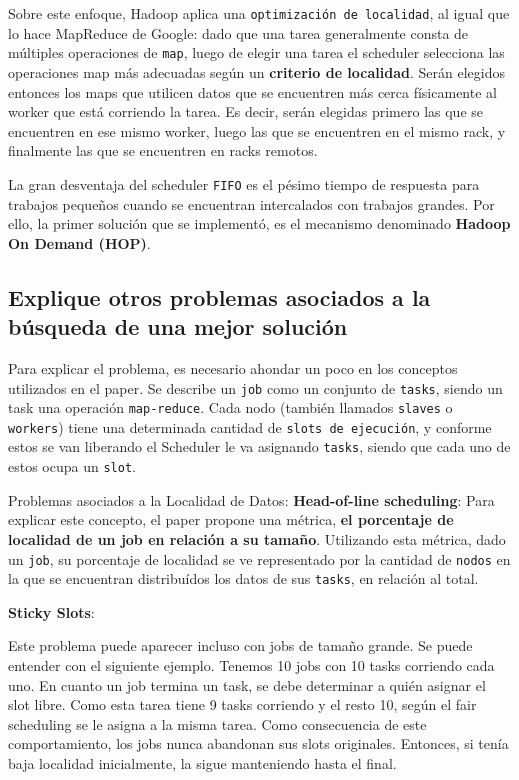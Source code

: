 \documentclass[11pt, a4paper, twoside]{article}
\begin{document}
Sobre este enfoque, Hadoop aplica una \texttt{optimización de localidad}, al
igual que lo hace MapReduce de Google: dado que una tarea generalmente consta de
múltiples operaciones de \texttt{map}, luego de elegir una tarea el scheduler
selecciona las operaciones map más adecuadas según un \textbf{criterio de
localidad}. Serán elegidos entonces los maps que utilicen datos que se
encuentren más cerca físicamente al worker que está corriendo la tarea. Es
decir, serán elegidas primero las que se encuentren en ese mismo worker, luego
las que se encuentren en el mismo rack, y finalmente las que se encuentren en
racks remotos.

La gran desventaja del scheduler \texttt{FIFO} es el pésimo tiempo de respuesta
para trabajos pequeños cuando se encuentran intercalados con trabajos grandes.
Por ello, la primer solución que se implementó, es el mecanismo denominado
\textbf{Hadoop On Demand (HOP)}.

\fixme

\clearpage
\subsection {\footnotesize Explique otros problemas asociados a la búsqueda de una mejor solución}
\label{investigacion-5}

Para explicar el problema, es necesario ahondar un poco en los conceptos
utilizados en el paper. Se describe un \texttt{job} como un conjunto de
\texttt{tasks}, siendo un task una operación \texttt{map-reduce}. Cada nodo
(también llamados \texttt{slaves} o \texttt{workers}) tiene una determinada
cantidad de \texttt{slots de ejecución}, y conforme estos se van liberando el
Scheduler le va asignando \texttt{tasks}, siendo que cada uno de estos ocupa
un \texttt{slot}.

Problemas asociados a la Localidad de Datos:
\textbf{Head-of-line scheduling}: Para explicar este concepto, el paper
propone una métrica, \textbf{el porcentaje de localidad de un job en relación
a su tamaño}. Utilizando esta métrica, dado un \texttt{job}, su porcentaje de
localidad se ve representado por la cantidad de \texttt{nodos} en la que se
encuentran distribuídos los datos de sus \texttt{tasks}, en relación al total.

\textbf{Sticky Slots}:

Este problema puede aparecer incluso con jobs de tamaño grande. Se puede entender con el siguiente ejemplo.
Tenemos 10 jobs con 10 tasks corriendo cada uno. En cuanto un job termina un task, se debe determinar a quién asignar el slot libre. Como esta tarea tiene 9 tasks corriendo y el resto 10, según el fair scheduling se le asigna a la misma tarea. Como consecuencia de este comportamiento, los jobs nunca abandonan sus slots originales. Entonces, si tenía baja localidad inicialmente, la sigue manteniendo hasta el final.
\end{document}
